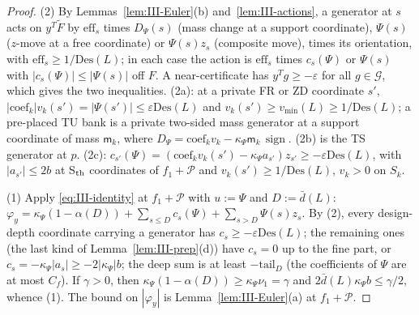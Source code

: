 \documentclass[10pt]{amsart}
\theoremstyle{definition}
\theoremstyle{remark}
\newcommand{\sgn}{\operatorname{sign}}
\begin{document}
\begin{proof}
(2) By Lemmas~\ref{lem:III-Euler}(b) and~\ref{lem:III-actions}, a generator at
$s$ acts on $y^T\tilde F$ by $\mathrm{eff}_s$ times $D_\Psi(s)$ (mass change at a
support coordinate), $\Psi(s)$ ($z$-move at a free coordinate) or $\Psi(s)z_s$
(composite move), times its orientation, with $\mathrm{eff}_s\ge1/\mathrm{Des}(L)$;
in each case the action is $\mathrm{eff}_s$ times $c_s(\Psi)$ or $\Psi(s)$ with
$|c_s(\Psi)|\le|\Psi(s)|$ off $F$.  A near-certificate has $y^Tg\ge-\varepsilon$
for all $g\in\mathcal G$, which gives the two inequalities.  (2a): at a private
FR or ZD coordinate $s'$, $|\mathrm{coef}_k|v_k(s')=|\Psi(s')|\le\varepsilon
\mathrm{Des}(L)$ and $v_k(s')\ge v_{\min}(L)\ge1/\mathrm{Des}(L)$; a pre-placed
TU bank is a private two-sided mass generator at a support coordinate of mass
$\mathsf m_k$, where $D_\Psi=\mathrm{coef}_kv_k-\kappa_\Psi\mathsf m_k\,\sgn$.
(2b) is the TS generator at $p$.  (2c): $c_{s'}(\Psi)=(\mathrm{coef}_kv_k(s')-
\kappa_\Psi a_{s'})z_{s'}\ge-\varepsilon\mathrm{Des}(L)$, with $|a_{s'}|\le2b$ at
S$_{\rm th}$ coordinates of $f_1+\mathcal P$ and $v_k(s')\ge1/\mathrm{Des}(L)$,
$v_k>0$ on $S_k$.

(1) Apply \eqref{eq:III-identity} at $f_1+\mathcal P$ with $u:=\Psi$ and
$D:=\bar d(L)$: $\varphi_y=\kappa_\Psi(1-\alpha(D))+\sum_{s\le D}c_s(\Psi)+
\sum_{s>D}\Psi(s)z_s$.  By (2), every design-depth coordinate carrying a
generator has $c_s\ge-\varepsilon\mathrm{Des}(L)$; the remaining ones (the last
kind of Lemma~\ref{lem:III-prep}(d)) have $c_s=0$ up to the fine part, or
$c_s=-\kappa_\Psi|a_s|\ge-2|\kappa_\Psi|b$; the deep sum is at least
$-\mathrm{tail}_D$ (the coefficients of $\Psi$ are at most $C_f$).  If $\gamma>0$,
then $\kappa_\Psi(1-\alpha(D))\ge\kappa_\Psi\nu_1=\gamma$ and $2\bar d(L)
\kappa_\Psi b\le\gamma/2$, whence (1).  The bound on $|\varphi_y|$ is
Lemma~\ref{lem:III-Euler}(a) at $f_1+\mathcal P$.


\end{proof}
\end{document}
